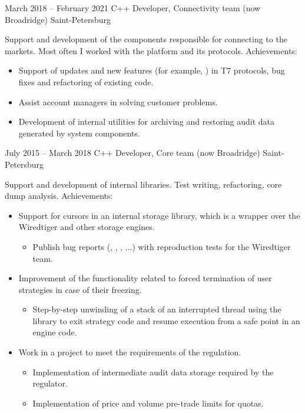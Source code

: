 \documentclass[11pt,a4paper,sans]{moderncv}
\begin{document}
\cventry
{March 2018 -- February 2021}
{C++ Developer, Connectivity team}
{(now Broadridge)}
{Saint-Petersburg}
{}
{Support and development of the components responsible for connecting to the markets. Most often I worked with the  platform and its protocols.\newline{}
Achievements:
\begin{itemize}
\item Support of updates and new features (for example, ) in T7 protocols, bug fixes and refactoring of existing code.
\item Assist account managers in solving customer problems.
\item Development of internal utilities for archiving and restoring audit data generated by system components.
\end{itemize}}

\cventry
{July 2015 -- March 2018}
{C++ Developer, Core team}
{(now Broadridge)}
{Saint-Petersburg}
{}
{Support and development of internal libraries. Test writing, refactoring, core dump analysis.\newline{}
Achievements:
\begin{itemize}
\item Support for  cursors in an internal storage library, which is a wrapper over the Wiredtiger and other storage engines.
  \begin{itemize}
  \item Publish bug reports (, , , ...) with reproduction tests for the Wiredtiger team.
  \end{itemize}
\item Improvement of the functionality related to forced termination of user strategies in case of their freezing.
  \begin{itemize}
  \item Step-by-step unwinding of a stack of an interrupted thread using the  library to exit strategy code and resume execution from a safe point in an engine code.
  \end{itemize}
\item Work in a project to meet the requirements of the  regulation.
  \begin{itemize}
  \item Implementation of intermediate audit data storage required by the regulator.
  \item Implementation of price and volume pre-trade limits for quotas.
  \end{itemize}
\end{itemize}}
\end{document}
